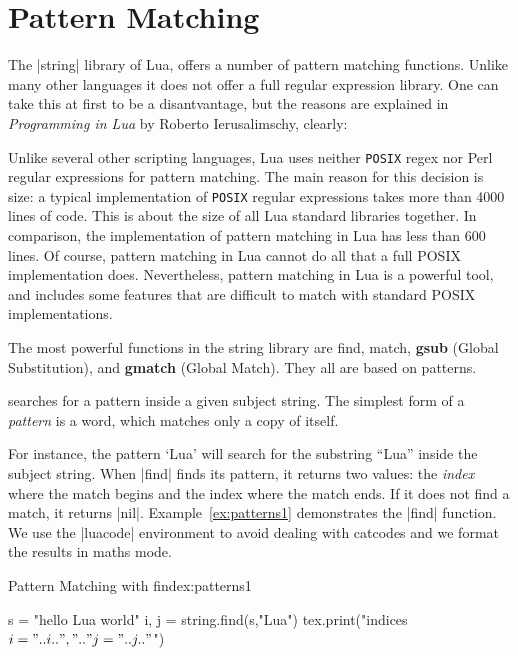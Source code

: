 \def\luacmd#1{\textbf{#1}}

\chapter{Pattern Matching}

The |string| library of Lua, offers a number of pattern matching functions. Unlike many other languages it does not offer a full regular expression library. One can take this at first to be a disantvantage, but the reasons are explained in \textit{Programming in Lua} by Roberto Ierusalimschy, clearly:

\begin{latexquotation}
Unlike several other scripting languages, Lua uses neither \texttt{POSIX} regex nor
Perl regular expressions for pattern matching. The main reason for this decision
is size: a typical implementation of \texttt{POSIX} regular expressions takes more than
4000 lines of code. This is about the size of all Lua standard libraries together.
In comparison, the implementation of pattern matching in Lua has less than
600 lines. Of course, pattern matching in Lua cannot do all that a full POSIX
implementation does. Nevertheless, pattern matching in Lua is a powerful tool,
and includes some features that are difficult to match with standard POSIX
implementations.
\end{latexquotation}

The most powerful functions in the string library are find, match, \luacmd{gsub} (Global
Substitution), and \luacmd{gmatch} (Global Match). They all are based on patterns.


searches for a pattern inside a given subject string. The simplest form of a \textit{pattern} is a word, which matches only a copy of itself.

For instance, the pattern ‘Lua’ will search for the substring “Lua” inside the
subject string. When |find| finds its pattern, it returns two values: the \textit{index} where the match begins and the index where the match ends. If it does not find a match, it returns |nil|. Example~\ref{ex:patterns1} demonstrates the |find| function. We use the |luacode| environment to avoid dealing with catcodes and we format the results in maths mode.

\begin{texexample}{Pattern Matching with find}{ex:patterns1}
\begin{luacode*}
s = "hello Lua world"
i, j = string.find(s,"Lua")
tex.print("indices $i="..i..",".."j="..j.."$")
\end{luacode*}
\end{texexample}


